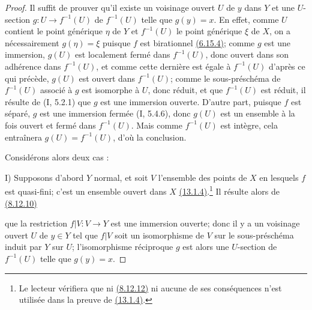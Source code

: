 \begin{proof}
Il suffit de prouver qu'il existe un voisinage ouvert $U$ de $y$ dans
$Y$ et une $U$-section $g:U\to f^{-1}(U)$ de $f^{-1}(U)$ telle que
$g(y)=x$. En effet, comme $U$ contient le point générique $\eta$ de
$Y$ et $f^{-1}(U)$ le point générique $\xi$ de $X$, on a
nécessairement $g(\eta)=\xi$ puisque $f$ est birationnel
{\hyperref[canon-index.ega4.c04.statement.6-15-4]{(6.15.4)}}; comme $g$ est une
immersion, $g(U)$ est localement fermé dans $f^{-1}(U)$, donc ouvert
dans son adhérence dans $f^{-1}(U)$, et comme cette dernière est égale
à $f^{-1}(U)$ d'après ce qui précède, $g(U)$ est ouvert dans
$f^{-1}(U)$; comme le sous-préschéma de $f^{-1}(U)$ associé à $g$ est
isomorphe à $U$, donc réduit, et que $f^{-1}(U)$ est réduit, il résulte
de (I, 5.2.1) que $g$ est une immersion ouverte. D'autre part, puisque
$f$ est séparé, $g$ est une immersion fermée (I, 5.4.6), donc $g(U)$
est un ensemble à la fois ouvert et fermé dans $f^{-1}(U)$. Mais comme
$f^{-1}(U)$ est intègre, cela entraînera $g(U)=f^{-1}(U)$, d'où la
conclusion.

Considérons alors deux cas :

\textup{I)} Supposons d'abord $Y$ normal, et soit $V$ l'ensemble des
points de $X$ en lesquels $f$ est quasi-fini; c'est un ensemble ouvert
dans $X$ {\hyperref[canon-index.ega4.c04.cor.13-1-4]{(13.1.4)}}.\footnote{Le
lecteur vérifiera que ni {\hyperlink{ega4.c04.cor.8-12-12}{(8.12.12)}}
ni aucune de ses conséquences n'est utilisée dans la preuve de
{\hyperref[canon-index.ega4.c04.cor.13-1-4]{(13.1.4)}}.} Il résulte alors de
{\hyperref[canon-index.ega4.c04.cor.8-12-10]{(8.12.10)}}

que la restriction $f|V:V\to Y$ est une immersion ouverte; donc il y a
un voisinage ouvert $U$ de $y\in Y$ tel que $f|V$ soit un isomorphisme
de $V$ sur le sous-préschéma induit par $Y$ sur $U$; l'isomorphisme
réciproque $g$ est alors une $U$-section de $f^{-1}(U)$ telle que
$g(y)=x$.


\end{proof}
